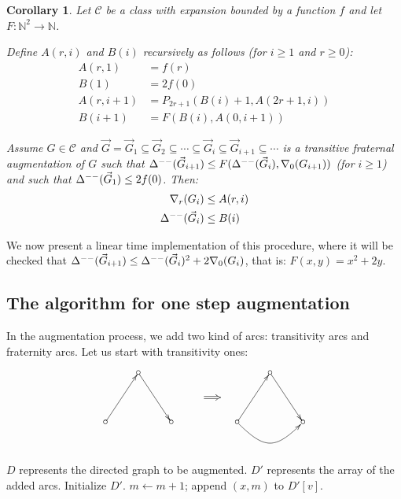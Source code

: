 \documentclass[a4paper]{amsart}
\newtheorem{corollary}[theorem]{Corollary}
\theoremstyle{definition}
\theoremstyle{remark}
\newcommand{\field}[1]{\mathbb{#1}}
\newcommand{\bbbn}{\field{N}}
\newcommand{\rdens}[1]{\nabla_{#1}}
\DeclareMathOperator\md{\Delta^{\rm --}}
\def\vG{\vec{G}}
\begin{document}
\begin{corollary}
Let $\mathcal C$ be a class with expansion bounded by a function $f$
and let $F:\bbbn^2\rightarrow\bbbn$. 

Define $A(r,i)$ and $B(i)$ recursively as follows (for $i\geq 1$
and $r\geq 0$):
\begin{align*}
A(r,1)&=f(r)\\
B(1)&=2f(0)\\
A(r,i+1)&=P_{2r+1}(B(i)+1,A(2r+1,i))\\
B(i+1)&=F(B(i),A(0,i+1))
\end{align*}

Assume $G\in\mathcal C$ and $\vG=\vG_1\subseteq\vG_2\subseteq\dotsb\subseteq
\vG_i\subseteq\vG_{i+1}\subseteq\dotsb$ is a transitive fraternal
augmentation of $G$ such that $\md(\vG_{i+1})\leq F(\md(\vG_i),\rdens{0}(G_{i+1}))$
(for $i\geq 1$) and such that $\md(\vG_1)\leq 2f(0)$.
Then:
\begin{align*}
\rdens{r}(G_i)&\leq A(r,i)\\
\md(\vG_i)&\leq B(i)
\end{align*}
\end{corollary}

We now present a linear time implementation of this procedure, where
 it will be checked that $\md(\vG_{i+1})\leq
 \md(\vG_i)^2+2\rdens{0}(G_i)$, that is: $F(x,y)=x^2+2y$.

\subsection{The algorithm for one step augmentation}
In the augmentation process, we add two kind of arcs:
transitivity arcs and fraternity arcs. Let us start with transitivity
ones:

$$
\begin{xy}<15pt,0cm>:
(0,0)*[o]{\circ{}}="va",
(4,0)*[o]{\circ{}}="vb",
(2,3)*[o]{\circ{}}="vc",
(6,1.5)="a",
(7,1.5)="b",
(8,0)*[o]{\circ{}}="wa",
(12,0)*[o]{\circ{}}="wb",
(10,3)*[o]{\circ{}}="wc",
\ar@{=>} "a";"b"
\ar@{->} "va";"vc"
\ar@{->} "vc";"vb"
\ar@{->} "wa";"wc"
\ar@{->} "wc";"wb"
\ar@{->}@(dr,dl) "wa";"wb" 
\end{xy}
$$

\vspace{5mm}
\begin{algorithmic}
\REQUIRE $D$ represents the directed graph to be augmented.
\ENSURE $D'$ represents the array of the added arcs.
\STATE Initialize $D'$.
\STATE $m\leftarrow m+1$; append $(x,m)$ to $D'[v]$.
\ENDFOR
\ENDFOR
\ENDFOR
\end{algorithmic}
\vspace{5mm}
\end{document}
